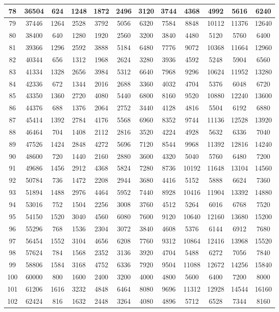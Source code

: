 \documentclass[oneside,english]{book}
\providecommand{\tabularnewline}{\\}
\begin{document}
\begin{center}
\begin{longtable}{|c|c|c|c|c|c|c|c|c|c|c|c|}
\hline
78 & 36504 & 624 & 1248 & 1872 & 2496 & 3120 & 3744 & 4368 & 4992 & 5616 & 6240\tabularnewline
\hline
79 & 37446 & 1264 & 2528 & 3792 & 5056 & 6320 & 7584 & 8848 & 10112 & 11376 & 12640\tabularnewline
\hline
80 & 38400 & 640 & 1280 & 1920 & 2560 & 3200 & 3840 & 4480 & 5120 & 5760 & 6400\tabularnewline
\hline
81 & 39366 & 1296 & 2592 & 3888 & 5184 & 6480 & 7776 & 9072 & 10368 & 11664 & 12960\tabularnewline
\hline
82 & 40344 & 656 & 1312 & 1968 & 2624 & 3280 & 3936 & 4592 & 5248 & 5904 & 6560\tabularnewline
\hline
83 & 41334 & 1328 & 2656 & 3984 & 5312 & 6640 & 7968 & 9296 & 10624 & 11952 & 13280\tabularnewline
\hline
84 & 42336 & 672 & 1344 & 2016 & 2688 & 3360 & 4032 & 4704 & 5376 & 6048 & 6720\tabularnewline
\hline
85 & 43350 & 1360 & 2720 & 4080 & 5440 & 6800 & 8160 & 9520 & 10880 & 12240 & 13600\tabularnewline
\hline
86 & 44376 & 688 & 1376 & 2064 & 2752 & 3440 & 4128 & 4816 & 5504 & 6192 & 6880\tabularnewline
\hline
87 & 45414 & 1392 & 2784 & 4176 & 5568 & 6960 & 8352 & 9744 & 11136 & 12528 & 13920\tabularnewline
\hline
88 & 46464 & 704 & 1408 & 2112 & 2816 & 3520 & 4224 & 4928 & 5632 & 6336 & 7040\tabularnewline
\hline
89 & 47526 & 1424 & 2848 & 4272 & 5696 & 7120 & 8544 & 9968 & 11392 & 12816 & 14240\tabularnewline
\hline
90 & 48600 & 720 & 1440 & 2160 & 2880 & 3600 & 4320 & 5040 & 5760 & 6480 & 7200\tabularnewline
\hline
91 & 49686 & 1456 & 2912 & 4368 & 5824 & 7280 & 8736 & 10192 & 11648 & 13104 & 14560\tabularnewline
\hline
92 & 50784 & 736 & 1472 & 2208 & 2944 & 3680 & 4416 & 5152 & 5888 & 6624 & 7360\tabularnewline
\hline
93 & 51894 & 1488 & 2976 & 4464 & 5952 & 7440 & 8928 & 10416 & 11904 & 13392 & 14880\tabularnewline
\hline
94 & 53016 & 752 & 1504 & 2256 & 3008 & 3760 & 4512 & 5264 & 6016 & 6768 & 7520\tabularnewline
\hline
95 & 54150 & 1520 & 3040 & 4560 & 6080 & 7600 & 9120 & 10640 & 12160 & 13680 & 15200\tabularnewline
\hline
96 & 55296 & 768 & 1536 & 2304 & 3072 & 3840 & 4608 & 5376 & 6144 & 6912 & 7680\tabularnewline
\hline
97 & 56454 & 1552 & 3104 & 4656 & 6208 & 7760 & 9312 & 10864 & 12416 & 13968 & 15520\tabularnewline
\hline
98 & 57624 & 784 & 1568 & 2352 & 3136 & 3920 & 4704 & 5488 & 6272 & 7056 & 7840\tabularnewline
\hline
99 & 58806 & 1584 & 3168 & 4752 & 6336 & 7920 & 9504 & 11088 & 12672 & 14256 & 15840\tabularnewline
\hline
100 & 60000 & 800 & 1600 & 2400 & 3200 & 4000 & 4800 & 5600 & 6400 & 7200 & 8000\tabularnewline
\hline
101 & 61206 & 1616 & 3232 & 4848 & 6464 & 8080 & 9696 & 11312 & 12928 & 14544 & 16160\tabularnewline
\hline
102 & 62424 & 816 & 1632 & 2448 & 3264 & 4080 & 4896 & 5712 & 6528 & 7344 & 8160\tabularnewline

\end{longtable}
\end{center}
\end{document}
